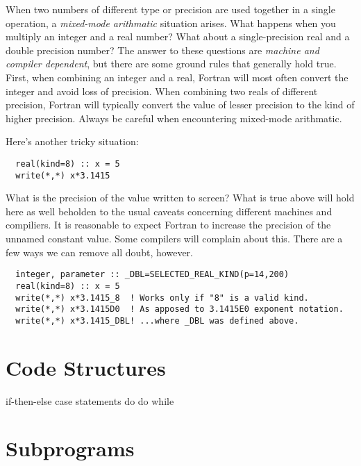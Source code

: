 \documentclass[11pt, letterpaper]{article}
\begin{document}
When two numbers of different type or precision are used together in a single
operation, a \emph{mixed-mode arithmatic} situation arises.  What happens when
you multiply an integer and a real number?  What about a single-precision
real and a double precision number?  The answer to these questions are
\emph{machine and compiler dependent}, but there are some ground rules that
generally hold true.  First, when combining an integer and a real, Fortran
will most often convert the integer and avoid loss of precision.  When
combining two reals of different precision, Fortran will typically convert the
value of lesser precision to the kind of higher precision.  Always be
careful when encountering mixed-mode arithmatic.

Here's another tricky situation:
\begin{verbatim}
  real(kind=8) :: x = 5
  write(*,*) x*3.1415
\end{verbatim}
What is the precision of the value written to screen?  What is true above
will hold here as well beholden to the usual caveats concerning different
machines and compiliers.  It is reasonable to expect Fortran to increase the
precision of the unnamed constant value.  Some compilers will complain about
this.  There are a few ways we can remove all doubt, however.
\begin{verbatim}
  integer, parameter :: _DBL=SELECTED_REAL_KIND(p=14,200)
  real(kind=8) :: x = 5
  write(*,*) x*3.1415_8  ! Works only if "8" is a valid kind.
  write(*,*) x*3.1415D0  ! As apposed to 3.1415E0 exponent notation.
  write(*,*) x*3.1415_DBL! ...where _DBL was defined above.
\end{verbatim}

\section{Code Structures}

if-then-else
case statements
do
do while


\section{Subprograms}
\end{document}
